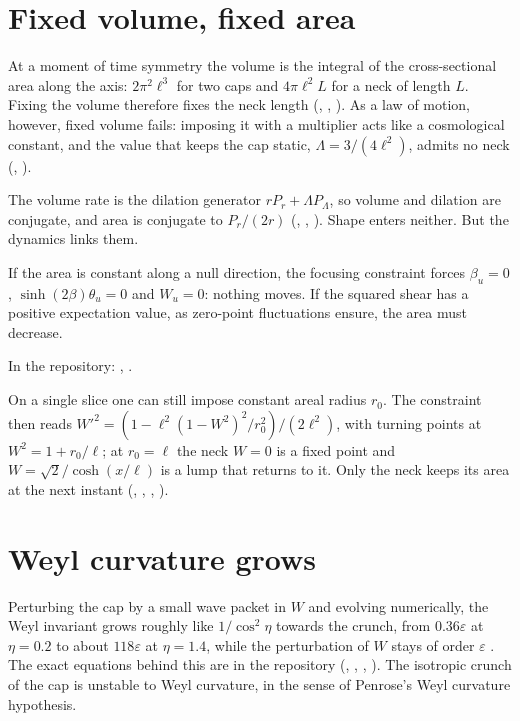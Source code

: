 \section{Fixed volume, fixed area}

At a moment of time symmetry the volume is the integral of the cross-sectional area along the axis: $2\pi^2\ell^3$ for two caps and $4\pi\ell^2L$ for a neck of length $L$. Fixing the volume therefore fixes the neck length (, , ). As a law of motion, however, fixed volume fails: imposing it with a multiplier acts like a cosmological constant, and the value that keeps the cap static, $\Lambda=3/(4\ell^2)$, admits no neck (, ). \negative

The volume rate is the dilation generator $rP_r+\Lambda P_\Lambda$, so volume and dilation are conjugate, and area is conjugate to $P_r/(2r)$ (, , ). Shape enters neither. But the dynamics links them.

\begin{theorem}\proved
If the area is constant along a null direction, the focusing constraint forces $\beta_u=0$, $\sinh(2\beta)\theta_u=0$ and $W_u=0$: nothing moves. If the squared shear has a positive expectation value, as zero-point fluctuations ensure, the area must decrease.
\end{theorem}
\noindent In the repository: , .

On a single slice one can still impose constant areal radius $r_0$. The constraint then reads $W'^2=(1-\ell^2(1-W^2)^2/r_0^2)/(2\ell^2)$, with turning points at $W^2=1+r_0/\ell$; at $r_0=\ell$ the neck $W=0$ is a fixed point and $W=\sqrt2/\cosh(x/\ell)$ is a lump that returns to it. Only the neck keeps its area at the next instant (, , , ).

\section{Weyl curvature grows}

Perturbing the cap by a small wave packet in $W$ and evolving numerically, the Weyl invariant grows roughly like $1/\cos^2\eta$ towards the crunch, from $0.36\varepsilon$ at $\eta=0.2$ to about $118\varepsilon$ at $\eta=1.4$, while the perturbation of $W$ stays of order $\varepsilon$ \numerical. The exact equations behind this are in the repository (, , , ). The isotropic crunch of the cap is unstable to Weyl curvature, in the sense of Penrose's Weyl curvature hypothesis.

